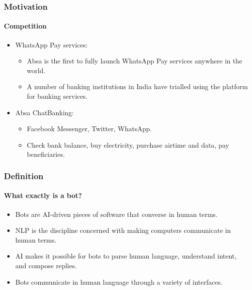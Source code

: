 \documentclass[11pt]{beamer}
\begin{document}
\begin{frame}
	\frametitle{Motivation}
	\framesubtitle{Competition}
	\begin{itemize}
		\item WhatsApp Pay services:
		\begin{itemize}
			\item Absa is the first to fully launch WhatsApp Pay services anywhere in the world.
			\item A number of banking institutions in India have trialled using the platform for banking services.
		\end{itemize}
		\item Absa ChatBanking:
		\begin{itemize}
			\item Facebook Messenger, Twitter, WhatsApp.
			\item Check bank balance, buy electricity, purchase airtime and data, pay beneficiaries.
		\end{itemize}
	\end{itemize}
\end{frame}


\begin{frame}
	\frametitle{Definition}
	\framesubtitle{What exactly is a bot?}
	\begin{itemize}
		\item Bots are AI-driven pieces of software that converse in human terms.
		\item NLP is the discipline concerned with making computers communicate in human terms.
		\item AI makes it possible for bots to parse human language, understand intent, and compose replies. 
		\item Bots communicate in human language through a variety of interfaces.
	\end{itemize}
\end{frame}
\end{document}
